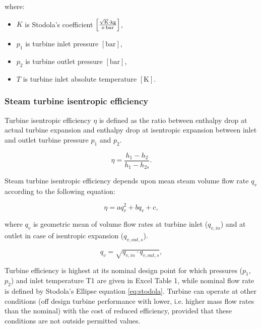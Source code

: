 \documentclass{article}
\begin{document}
	\noindent
	where:
	
	\begin{itemize}
		\item $K$ is Stodola’s coefficient $\left[\frac{\sqrt{\textrm{K}}\cdot 
		\textrm{kg}}{\textrm{s} \cdot \textrm{\textrm{bar}}}\right]$, 
		\item $p_1$ is turbine inlet pressure $\left[\textrm{bar}\right]$,
		\item $p_2$ is turbine outlet pressure $\left[\textrm{bar}\right]$,
		\item $T$ is turbine inlet absolute temperature 
		$\left[\textrm{K}\right]$.
	\end{itemize}
	
	\subsubsection*{Steam turbine isentropic efficiency}
	
	Turbine isentropic efficiency $\eta$ is defined as the ratio between enthalpy drop at actual turbine expansion and enthalpy drop at isentropic expansion between inlet and outlet turbine pressure $p_1$ and $p_2$.
	
	\begin{equation}\label{eq:eta}
		\eta = \frac{h_1-h_2}{h_1 - h_{2s}}.
	\end{equation}
	
	Steam turbine isentropic efficiency depends upon mean steam volume flow 
	rate $q_v$ according to the following equation:
	
	\begin{equation}\label{eq:eta2}
		\eta = aq_v^2 + bq_v + c,
	\end{equation}
	
	\noindent
	where $q_v$ is geometric mean of volume flow rates at turbine inlet ($q_{v,in}$) and at outlet in case of isentropic expansion ($q_{v,out,s}$). 
	
	\begin{equation}\label{eq:q_v}
		q_v = \sqrt{q_{v,in} \cdot q_{v,out,s}},
	\end{equation}
	
	Turbine efficiency is highest at its nominal design point for which 
	pressures ($p_1$, $p_2$) and inlet temperature T1 are given in Excel Table 
	1, while nominal flow rate is defined by Stodola’s Ellipse equation 
	\ref{eq:stodola}. Turbine can operate at other conditions (off design 
	turbine performance with lower, i.e. higher mass flow rates than the 
	nominal) with the cost of reduced efficiency, provided that these 
	conditions are not outside permitted values.
	
\end{document}
